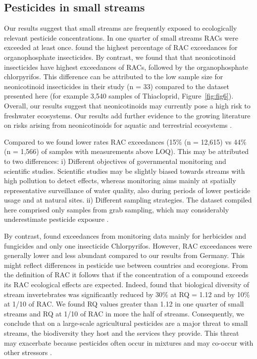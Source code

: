 \documentclass[journal=esthag,manuscript=article]{achemso}
\begin{document}
\subsection{Pesticides in small streams}
Our results suggest that small streams are frequently exposed to ecologically relevant pesticide concentrations.
In one quarter of small streams RACs were exceeded at least once.
\citet{stehle_pesticide_2015} found the highest percentage of RAC exceedances for organophosphate insecticides. 
By contrast, we found that that neonicotinoid insecticides have highest exceedances of RACs, followed by the organophosphate chlorpyrifos. 
This difference can be attributed to the low sample size for neonicotinoid insecticides in their study (n = 33) compared to the dataset presented here (for example 3,540 samples of Thiacloprid, Figure~\ref{fig:fig6}). 
Overall, our results suggest that neonicotinoids may currently pose a high risk to freshwater ecosystems. 
Our results add further evidence to the growing literature on risks arising from neonicotinoids for aquatic \citep{morrissey2015neonicotinoid} and terrestrial ecosystems \citep{pisa2015effects}.

Compared to \citet{stehle_pesticide_2015} we found lower rates RAC exceedances (15\% (n = 12,615) vs 44\% (n = 1,566) of samples with measurements above LOQ). 
This may be attributed to two differences: i) Different objectives of governmental monitoring and scientific studies. Scientific studies may be slightly biased towards streams with high pollution to detect effects, whereas monitoring aims mainly at spatially representative surveillance of water quality, also during periods of lower pesticide usage and at natural sites. ii) Different sampling strategies. The dataset compiled here comprised only samples from grab sampling, which may considerably underestimate pesticide exposure \citep{stehle_probabilistic_2013}. 

By contrast, \citet{knauer_pesticides_2016} found exceedances from monitoring data mainly for herbicides and fungicides and only one insecticide Chlorpyrifos.
However, RAC exceedances were generally lower and less abundant compared to our results from Germany. 
This might reflect differences in pesticide use between countries and ecoregions. 
From the definition of RAC it follows that if the concentration of a compound exceeds its RAC ecological effects are expected.
Indeed, \citet{stehle_agricultural_2015} found that biological diversity of stream invertebrates was significantly reduced by 30\% at RQ = 1.12 and by 10\% at 1/10 of RAC.
We found RQ values greater than 1.12 in one quarter of small streams and RQ at 1/10 of RAC in more the half of streams. 
Consequently, we conclude that on a large-scale agricultural pesticides are a major threat to small streams, the biodiversity they host and the services they provide. 
This threat may exacerbate because pesticides often occur in mixtures \cite{schreiner_pesticide_2016} and may co-occur with other stressors \citep{schafer_contribution_2016}.
\end{document}
